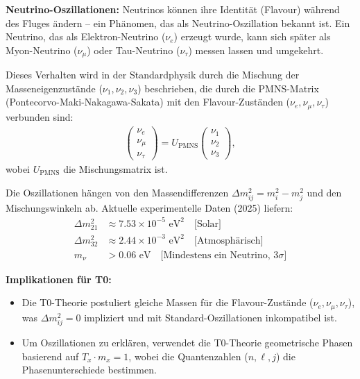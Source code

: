 \documentclass[12pt,a4paper]{article}
\begin{document}
	\begin{important}
		\textbf{Neutrino-Oszillationen:} Neutrinos können ihre Identität (Flavour) während des Fluges ändern – ein Phänomen, das als Neutrino-Oszillation bekannt ist. Ein Neutrino, das als Elektron-Neutrino (\(\nu_e\)) erzeugt wurde, kann sich später als Myon-Neutrino (\(\nu_\mu\)) oder Tau-Neutrino (\(\nu_\tau\)) messen lassen und umgekehrt.
		
		Dieses Verhalten wird in der Standardphysik durch die Mischung der Masseneigenzustände (\(\nu_1, \nu_2, \nu_3\)) beschrieben, die durch die PMNS-Matrix (Pontecorvo-Maki-Nakagawa-Sakata) mit den Flavour-Zuständen (\(\nu_e, \nu_\mu, \nu_\tau\)) verbunden sind:
		\begin{align}
			\begin{pmatrix}
				\nu_e \\ \nu_\mu \\ \nu_\tau
			\end{pmatrix}
			=
			U_{\text{PMNS}}
			\begin{pmatrix}
				\nu_1 \\ \nu_2 \\ \nu_3
			\end{pmatrix},
		\end{align}
		wobei \(U_{\text{PMNS}}\) die Mischungsmatrix ist.
		
		Die Oszillationen hängen von den Massendifferenzen \(\Delta m^2_{ij} = m_i^2 - m_j^2\) und den Mischungswinkeln ab. Aktuelle experimentelle Daten (2025) liefern:
		\begin{align}
			\Delta m^2_{21} &\approx 7.53 \times 10^{-5} \text{ eV}^2 \quad \text{[Solar]} \\
			\Delta m^2_{32} &\approx 2.44 \times 10^{-3} \text{ eV}^2 \quad \text{[Atmosphärisch]} \\
			m_\nu &> 0.06 \text{ eV} \quad \text{[Mindestens ein Neutrino, 3}\sigma\text{]}
		\end{align}
		
		\textbf{Implikationen für T0:}
		\begin{itemize}
			\item Die T0-Theorie postuliert gleiche Massen für die Flavour-Zustände (\(\nu_e, \nu_\mu, \nu_\tau\)), was \(\Delta m^2_{ij} = 0\) impliziert und mit Standard-Oszillationen inkompatibel ist.
			\item Um Oszillationen zu erklären, verwendet die T0-Theorie geometrische Phasen basierend auf \( T_x \cdot m_x = 1 \), wobei die Quantenzahlen (\(n, \ell, j\)) die Phasenunterschiede bestimmen.
		\end{itemize}
	\end{important}
	
\end{document}
